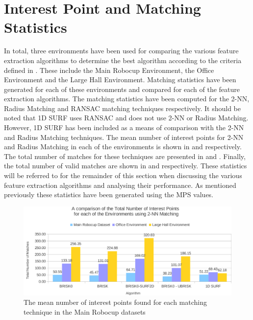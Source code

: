 \documentclass[11pt]{report}
\begin{document}



\section{Interest Point and Matching Statistics}
\label{sec:matchingStats}
In total, three environments have been used for comparing the various feature extraction algorithms to determine the best algorithm according to the criteria defined in . These include the Main Robocup Environment, the Office Environment and the Large Hall Environment. Matching statistics have been generated for each of these environments and compared for each of the feature extraction algorithms. The matching statistics have been computed for the 2-NN, Radius Matching and RANSAC matching techniques respectively. It should be noted that 1D SURF uses RANSAC and does not use 2-NN or Radius Matching. However, 1D SURF has been included as a means of comparison with the 2-NN and Radius Matching techniques. The mean number of interest points for 2-NN and Radius Matching in each of the environments is shown in  and  respectively. The total number of matches for these techniques are presented in  and . Finally, the total number of valid matches are shown in  and  respectively. These statistics will be referred to for the remainder of this section when discussing the various feature extraction algorithms and analysing their performance. As mentioned previously these statistics have been generated using the MPS values.\\

 \begin{figure}%
  \centering
    \includegraphics[width=1.0\textwidth]{../Drawings/Graphs/overall_tn_ip.pdf}
    \caption{The mean number of interest points found for each matching technique in the Main Robocup datasets} 
    \label{fig:overall_tn_ip}
 \end{figure}
 
\end{document}
